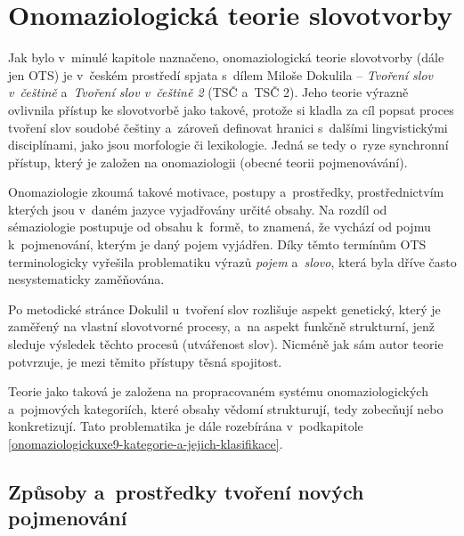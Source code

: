 \hypertarget{onomaziologickuxe1-teorie-slovotvorby}{%
\chapter{Onomaziologická teorie
slovotvorby}\label{onomaziologickuxe1-teorie-slovotvorby}}

Jak bylo v~minulé kapitole naznačeno, onomaziologická teorie slovotvorby
(dále jen OTS) je v~českém prostředí spjata s~dílem Miloše Dokulila --
\emph{Tvoření slov v~češtině} a~\emph{Tvoření slov v~češtině 2} (TSČ
a~TSČ 2). Jeho teorie výrazně ovlivnila přístup ke slovotvorbě jako
takové, protože si kladla za cíl popsat proces tvoření slov soudobé
češtiny a~zároveň definovat hranici s~dalšími lingvistickými
disciplínami, jako jsou morfologie či lexikologie. Jedná se tedy o~ryze
synchronní přístup, který je založen na onomaziologii (obecné teorii
pojmenovávání).~\parencite{enc-ots17}

Onomaziologie zkoumá takové motivace, postupy a~prostředky,
prostřednictvím kterých jsou v~daném jazyce vyjadřovány určité obsahy.
Na rozdíl od sémaziologie postupuje od obsahu k~formě, to znamená, že
vychází od pojmu k~pojmenování, kterým je daný pojem vyjádřen.
\parencite{enc-onomaz17} Díky těmto termínům OTS terminologicky vyřešila
problematiku výrazů \emph{pojem} a~\emph{slovo}, která byla dříve často
nesystematicky zaměňována.~\parencite[267]{rousinova07}

Po metodické stránce Dokulil u~tvoření slov rozlišuje aspekt genetický,
který je zaměřený na vlastní slovotvorné procesy, a~na aspekt funkčně
strukturní, jenž sleduje výsledek těchto procesů (utvářenost slov).
Nicméně jak sám autor teorie potvrzuje, je mezi těmito přístupy těsná
spojitost.~\parencite[9]{dokulil62}

Teorie jako taková je založena na propracovaném systému
onomaziologických a~pojmových kategoriích, které obsahy vědomí
strukturují, tedy zobecňují nebo konkretizují.
\parencite{enc-onomaz-kateg17} Tato problematika je dále rozebírána
v~podkapitole \ref{onomaziologickuxe9-kategorie-a-jejich-klasifikace}.

\hypertarget{zpux16fsoby-a-prostux159edky-tvoux159enuxed-novuxfdch-pojmenovuxe1nuxed}{%
\section{Způsoby a~prostředky tvoření nových
pojmenování}\label{zpux16fsoby-a-prostux159edky-tvoux159enuxed-novuxfdch-pojmenovuxe1nuxed}}

